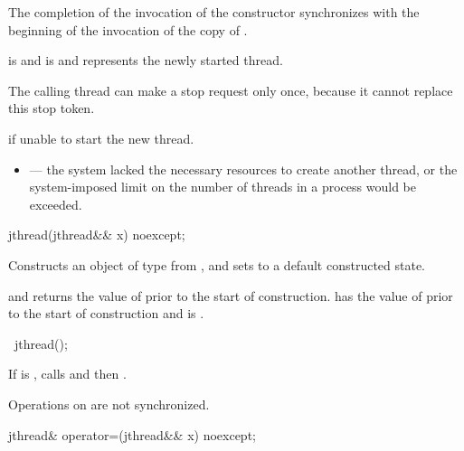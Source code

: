 \begin{itemdescr}
\pnum
\sync
The completion of the invocation of the constructor
synchronizes with the beginning of the invocation of the copy of .

\pnum
\ensures
{} is 
and  is 
and  represents the newly started thread.
\begin{note}
The calling thread can make a stop request only once,
because it cannot replace this stop token.
\end{note}

\pnum
\throws
{} if unable to start the new thread.

\pnum
\errors
\begin{itemize}
\item {} --- the system lacked
the necessary resources to create another thread,
or the system-imposed limit on the number of threads in a process
would be exceeded.
\end{itemize}
\end{itemdescr}

%
\begin{itemdecl}
jthread(jthread&& x) noexcept;
\end{itemdecl}

\begin{itemdescr}
\pnum
\effects
Constructs an object of type  from , and sets
 to a default constructed state.

\pnum
\ensures
{}
and  returns the value of 
prior to the start of construction.
 has the value of 
prior to the start of construction
and  is .
\end{itemdescr}

%
\begin{itemdecl}
~jthread();
\end{itemdecl}

\begin{itemdescr}
\pnum
\effects
If  is ,
calls  and then .
\begin{note}
Operations on  are not synchronized.
\end{note}
\end{itemdescr}

%
\begin{itemdecl}
jthread& operator=(jthread&& x) noexcept;
\end{itemdecl}


